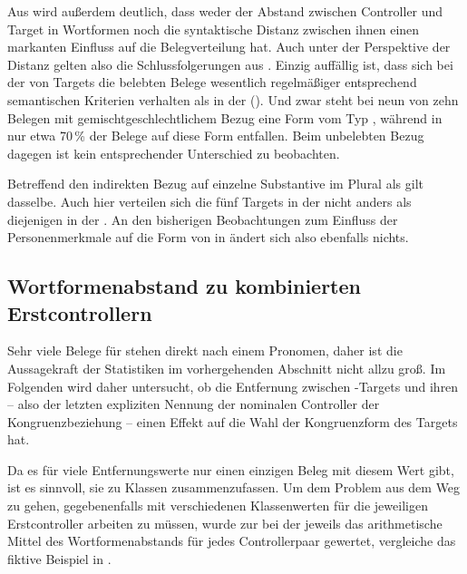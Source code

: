 Aus  wird außerdem deutlich, dass weder der Abstand
zwischen Controller und Target in Wortformen noch die
syntaktische Distanz zwischen ihnen einen markanten
Einfluss auf die Belegverteilung hat. Auch unter
der Perspektive der Distanz gelten also die Schlussfolgerungen aus
. Einzig auffällig ist, dass sich bei der
 von Targets die belebten Belege wesentlich
regelmäßiger entsprechend semantischen Kriterien verhalten als in der
 (). Und zwar steht bei neun von zehn
Belegen mit gemischtgeschlechtlichem Bezug eine Form vom Typ ,
während in  nur etwa 70\,\% der Belege auf diese Form
entfallen. Beim unbelebten Bezug dagegen ist kein entsprechender
Unterschied zu beobachten.

Betreffend den indirekten Bezug auf einzelne Substantive im
Plural als  gilt dasselbe. Auch hier verteilen sich die
fünf Targets in der   nicht anders als
diejenigen in der  . An den bisherigen
Beobachtungen zum Einfluss der Personenmerkmale auf die
Form von  in  ändert sich also
ebenfalls nichts.


\subsection{Wortformenabstand zu kombinierten Erstcontrollern}

Sehr viele Belege für  stehen direkt nach einem Pronomen, daher ist
die Aussagekraft der Statistiken im vorhergehenden Abschnitt nicht allzu groß.
Im Folgenden wird daher untersucht, ob die Entfernung zwischen
-Targets und ihren  -- also der letzten
expliziten Nennung der nominalen Controller der
Kongruenzbeziehung -- einen Effekt auf die Wahl der
Kongruenzform des Targets hat.

Da es für viele Entfernungswerte nur einen einzigen Beleg mit
diesem Wert gibt, ist es sinnvoll, sie zu Klassen zusammenzufassen. Um dem
Problem aus dem Weg zu gehen, gegebenenfalls mit verschiedenen Klassenwerten
für die jeweiligen Erstcontroller arbeiten zu müssen, wurde zur
 bei der  jeweils das
arithmetische Mittel des Wortformenabstands für jedes Controllerpaar gewertet,
vergleiche das fiktive Beispiel in .

